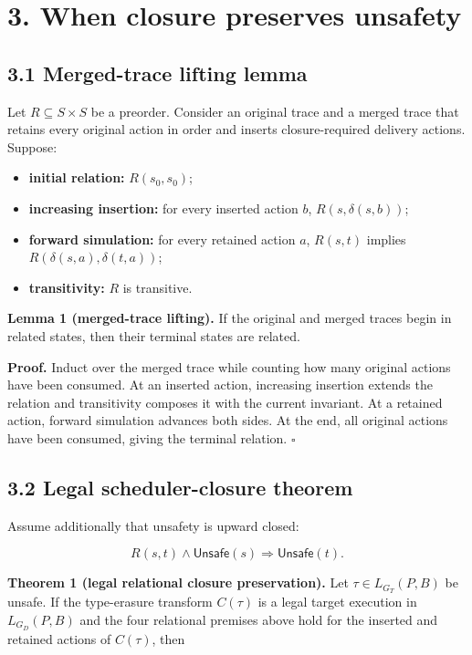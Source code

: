 \documentclass[10pt,a4paper]{article}
\newcommand{\tightlist}{\setlength{\itemsep}{0pt}\setlength{\parskip}{0pt}}
\begin{document}
\section{3. When closure preserves
unsafety}\label{when-closure-preserves-unsafety}

\subsection{3.1 Merged-trace lifting
lemma}\label{merged-trace-lifting-lemma}

Let \(R\subseteq S\times S\) be a preorder. Consider an original trace
and a merged trace that retains every original action in order and
inserts closure-required delivery actions. Suppose:

\begin{itemize}
\tightlist
\item
  \textbf{initial relation:} \(R(s_0,s_0)\);
\item
  \textbf{increasing insertion:} for every inserted action \(b\),
  \(R(s,\delta(s,b))\);
\item
  \textbf{forward simulation:} for every retained action \(a\),
  \(R(s,t)\) implies \(R(\delta(s,a),\delta(t,a))\);
\item
  \textbf{transitivity:} \(R\) is transitive.
\end{itemize}

\textbf{Lemma 1 (merged-trace lifting).} If the original and merged
traces begin in related states, then their terminal states are related.

\textbf{Proof.} Induct over the merged trace while counting how many
original actions have been consumed. At an inserted action, increasing
insertion extends the relation and transitivity composes it with the
current invariant. At a retained action, forward simulation advances
both sides. At the end, all original actions have been consumed, giving
the terminal relation. \(\square\)

\subsection{3.2 Legal scheduler-closure
theorem}\label{legal-scheduler-closure-theorem}

Assume additionally that unsafety is upward closed:

\[
R(s,t)\land\mathsf{Unsafe}(s)\Rightarrow\mathsf{Unsafe}(t).
\]

\textbf{Theorem 1 (legal relational closure preservation).} Let
\(\tau\in L_{G_T}(P,B)\) be unsafe. If the type-erasure transform
\(C(\tau)\) is a legal target execution in \(L_{G_D}(P,B)\) and the four
relational premises above hold for the inserted and retained actions of
\(C(\tau)\), then
\end{document}
